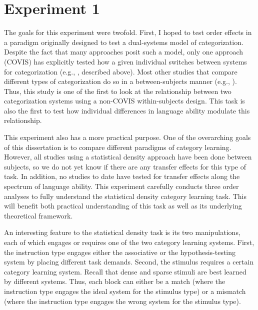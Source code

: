 \documentclass[../dissertation.tex]{subfiles}
\begin{document}
\section{Experiment 1}

The goals for this experiment were twofold. First, I hoped to test order effects in a paradigm originally designed to test a dual-systems model of categorization. Despite the fact that many approaches posit such a model, only one approach (COVIS) has explicitly tested how a given individual switches between systems for categorization (e.g., \citealp{Ashby2010, Erickson2008}, described above). Most other studies that compare different types of categorization do so in a between-subjects manner (e.g., \citealp{Kloos2008}). Thus, this study is one of the first to look at the relationship between two categorization systems using a non-COVIS within-subjects design. This task is also the first to test how individual differences in language ability modulate this relationship. \par
	This experiment also has a more practical purpose. One of the overarching goals of this dissertation is to compare different paradigms of category learning. However, all studies using a statistical density approach have been done between subjects, so we do not yet know if there are any transfer effects for this type of task. In addition, no studies to date have tested for transfer effects along the spectrum of language ability. This experiment carefully conducts three order analyses to fully understand the statistical density category learning task. This will benefit both  practical understanding of this task as well as its underlying theoretical framework. \par
	An interesting feature to the statistical density task is its two manipulations, each of which engages or requires one of the two category learning systems. First, the instruction type engages either the associative or the hypothesis-testing system by placing different task demands. Second, the stimulus requires a certain category learning system. Recall that dense and sparse stimuli are best learned by different systems. Thus, each block can either be a match (where the instruction type engages the ideal system for the stimulus type) or a mismatch (where the instruction type engages the wrong system for the stimulus type). \par 
\end{document}
